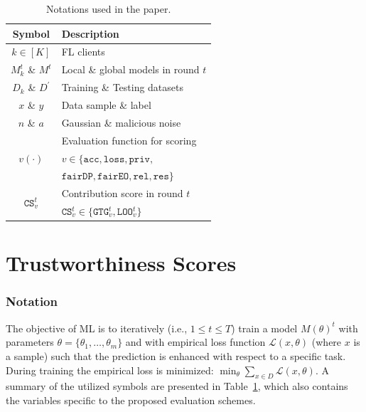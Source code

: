 \documentclass[acmsmall]{acmart}
\begin{document}
\begin{table}
    \vspace{-1cm}
    \centering
    \small
    \begin{tabular}{c|l}
        Symbol & Description \\
        \hline
        $k\in[K]$ & FL clients \\
        $M_k^t$ \& $M^t$ & Local \& global models in round $t$ \\
        $D_k$ \& $D^\prime$ & Training \& Testing datasets \\
        $x$ \& $y$ & Data sample \& label \\
        $n$ \& $a$ & Gaussian \& malicious noise \\
        & Evaluation function for scoring \\
        $v(\cdot)$ & $v \in \{\mathtt{acc}, \mathtt{loss}, \mathtt{priv},$ \\
        & $\mathtt{fairDP}, \mathtt{fairEO}, \mathtt{rel}, \mathtt{res}\}$ \\
        \multirow{2}{*}{$\mathtt{CS}^t_v$} & Contribution score in round $t$ \\
        & $\mathtt{CS}^t_v\in\{\mathtt{GTG}^t_v, \mathtt{LOO}^t_v\}$ \\
    \end{tabular}
    \caption{Notations used in the paper.}
    \label{tab:notations}
    \vspace{-1cm}
\end{table}

\section{Trustworthiness Scores}
\label{sec:mod}

\subsubsection*{Notation}

The objective of ML is to iteratively (i.e., $1\leq t \leq T$) train a model $M(\theta)^t$ with parameters $\theta=\{\theta_1,\dots,\theta_m\}$ and with empirical loss function $\mathcal{L}(x,\theta)$ (where $x$ is a sample) such that the prediction is enhanced with respect to a specific task. During training the empirical loss is minimized: $\min_\theta \sum_{x\in D}\mathcal{L}(x,\theta)$. A summary of the utilized symbols are presented in Table~\ref{tab:notations}, which also contains the variables specific to the proposed evaluation schemes.
\end{document}
